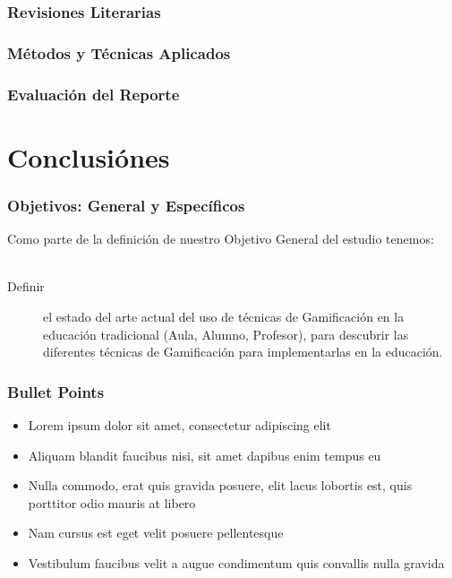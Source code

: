 \documentclass{beamer}
\begin{document}
\subsubsection{Revisiones Literarias} %

\subsubsection{Métodos y Técnicas Aplicados} %

\subsubsection{Evaluación del Reporte} %

\section{Conclusiónes} %

\begin{frame}
\frametitle{Objetivos: General y Específicos}
Como parte de la definición de nuestro Objetivo General del estudio tenemos:\\~\\
\begin{description}
	\item[Definir] el estado del arte actual del uso de técnicas de Gamificación en la educación tradicional (Aula, Alumno, Profesor), para descubrir las diferentes técnicas de Gamificación para implementarlas en la educación.
\end{description}

\end{frame}


\begin{frame}
\frametitle{Bullet Points}
\begin{itemize}
\item Lorem ipsum dolor sit amet, consectetur adipiscing elit
\item Aliquam blandit faucibus nisi, sit amet dapibus enim tempus eu
\item Nulla commodo, erat quis gravida posuere, elit lacus lobortis est, quis porttitor odio mauris at libero
\item Nam cursus est eget velit posuere pellentesque
\item Vestibulum faucibus velit a augue condimentum quis convallis nulla gravida
\end{itemize}
\end{frame}
\end{document}
